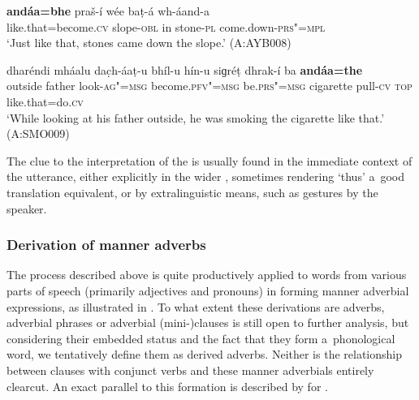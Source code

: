 \begin{exe}
\ex
\label{ex:7-42}
\gll \textbf{andáa=bhe} praš-í wée baṭ-á wh-áand-a \\
like.that=become.\textsc{cv} slope-\textsc{obl} in stone-\textsc{pl} come.down-\textsc{prs"=mpl} \\
\glt `Just like that, stones came down the slope.' (A:AYB008)
\end{exe}
\begin{exe}
\ex
\label{ex:7-43}
\gll dharéndi mháalu dac̣h-áaṭ-u bhíl-u hín-u  siɡréṭ dhrak-í ba \textbf{andáa=the} \\
outside father look-\textsc{ag"=msg} become.\textsc{pfv"=msg} be.\textsc{prs"=msg} cigarette pull-\textsc{cv} \textsc{top} like.that=do.\textsc{cv}  \\
\glt `While looking at his father outside, he was smoking the cigarette like that.' (A:SMO009)
\end{exe}

The clue to the interpretation of the   is usually found in the immediate context of the utterance, either explicitly in the wider , sometimes rendering `thus' a~good translation equivalent, or by extralinguistic means, such as gestures by the speaker. 


\subsubsection*{Derivation of manner adverbs}

The  process described above is quite productively applied to words from various parts
of speech (primarily adjectives and pronouns) in forming manner adverbial expressions, as
illustrated in . To what extent these derivations are adverbs, adverbial phrases or
adverbial (mini-)clauses is still open to further analysis, but considering their embedded status
and the fact that they form a~phonological word, we tentatively define them as derived
adverbs. Neither is the relationship between  clauses with conjunct verbs and these manner
adverbials entirely clearcut. An exact parallel to this formation is described by
\citet[219]{schmidtkohistani2008} for \iliKohistani \iliShina.


